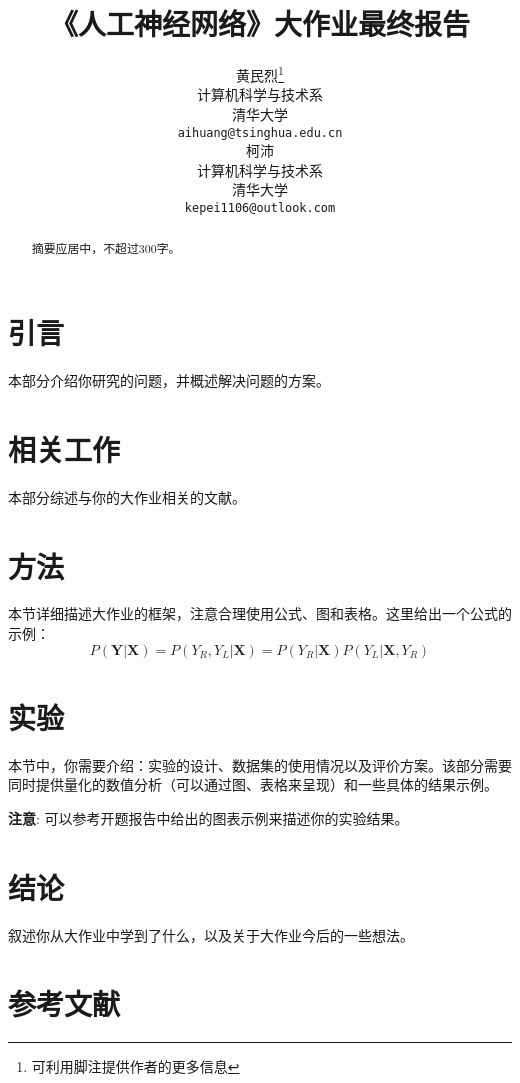 \documentclass{article}
\title{《人工神经网络》大作业最终报告}
\author{
  黄民烈\thanks{可利用脚注提供作者的更多信息} \\
  计算机科学与技术系 \\
  清华大学 \\
  \texttt{aihuang@tsinghua.edu.cn} \\
  \AND
  柯沛\\
  计算机科学与技术系 \\
  清华大学 \\
  \texttt{kepei1106@outlook.com} \\
}
\begin{document}
\maketitle

\begin{abstract}

摘要应居中，不超过300字。

\end{abstract}


\section{引言}

本部分介绍你研究的问题，并概述解决问题的方案。


\section{相关工作}

本部分综述与你的大作业相关的文献。

\section{方法}

本节详细描述大作业的框架，注意合理使用公式、图和表格。这里给出一个公式的示例：
\begin{equation}
P(\mathbf{Y}|\mathbf{X})  =  P(Y_R, Y_L|\mathbf{X}) = P(Y_R|\mathbf{X})P(Y_L|\mathbf{X}, Y_R) 
\end{equation}

\section{实验}

本节中，你需要介绍：实验的设计、数据集的使用情况以及评价方案。该部分需要同时提供量化的数值分析（可以通过图、表格来呈现）和一些具体的结果示例。


\textbf{注意}: 可以参考开题报告中给出的图表示例来描述你的实验结果。


\section{结论}

叙述你从大作业中学到了什么，以及关于大作业今后的一些想法。

\section*{参考文献}
\end{document}
